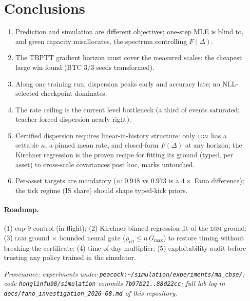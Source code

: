 \documentclass[11pt]{article}
\newcommand{\lgm}{\textsc{lgm}}
\newcommand{\Fano}{F}
\begin{document}
\section{Conclusions}

\begin{enumerate}
\item Prediction and simulation are different objectives; one-step MLE is blind to,
and given capacity misallocates, the spectrum controlling $\Fano(\Delta)$.
\item The TBPTT gradient horizon must cover the measured scales: the cheapest large
win found (BTC 3/3 seeds transformed).
\item Along one training run, dispersion peaks early and accuracy late; no
NLL-selected checkpoint dominates.
\item The rate ceiling is the current level bottleneck (a third of events saturated;
teacher-forced dispersion nearly right).
\item Certified dispersion requires linear-in-history structure: only \lgm{} has a
settable $n$, a pinned mean rate, and closed-form $\Fano(\Delta)$ at any horizon;
the Kirchner regression is the proven recipe for fitting its ground (typed, per
asset) to cross-scale covariances post hoc, marks untouched.
\item Per-asset targets are mandatory ($n$: 0.948 vs 0.973 is a $4\times$ Fano
difference); the tick regime (IS share) should shape typed-kick priors.
\end{enumerate}

\paragraph{Roadmap.} (1) cap-9 control (in flight); (2) Kirchner binned-regression
fit of the \lgm{} ground; (3) \lgm{} ground $\times$ bounded neural gate
($\rho_{\text{eff}}\le n\,G_{\max}$) to restore timing without breaking the
certificate; (4) time-of-day multiplier; (5) exploitability audit before trusting any
policy trained in the simulator.

\vspace{1em}
\noindent\small\textit{Provenance: experiments under
\texttt{peacock:\textasciitilde/simulation/experiments/ma\_cbse/}; code
\texttt{honglinfu98/simulation} commits \texttt{7b97b21..88d22cc}; full lab log in
\texttt{docs/fano\_investigation\_2026-08.md} of this repository.}
\end{document}
